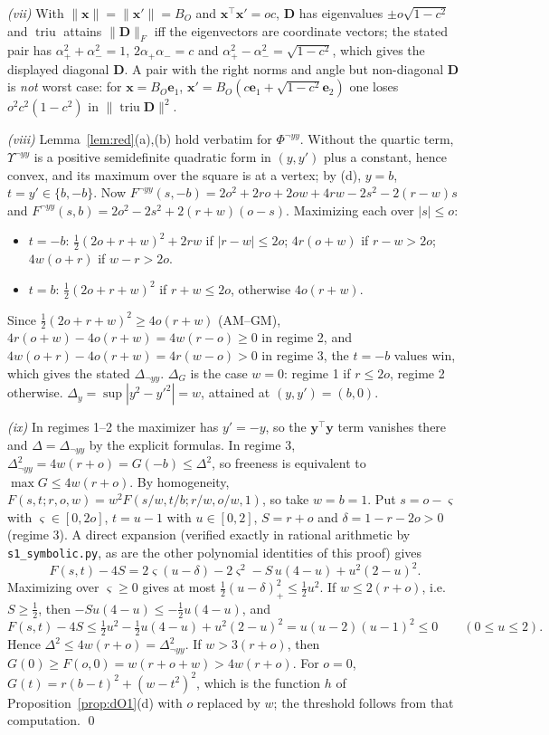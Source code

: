\documentclass[11pt]{article}
\theoremstyle{definition}
\theoremstyle{plain}
\newcommand{\by}{\mathbf{y}}
\newcommand{\bx}{\mathbf{x}}
\DeclareMathOperator{\triu}{triu}
\newcommand{\bD}{\mathbf{D}}
\newcommand{\be}{\mathbf{e}}
\begin{document}
\emph{(vii)} With $\|\bx\|=\|\bx'\|=B_O$ and $\bx^\top\bx'=oc$, $\bD$ has eigenvalues $\pm o\sqrt{1-c^2}$ and $\triu$ attains $\|\bD\|_F$ iff the eigenvectors are coordinate vectors; the stated pair has $\alpha_+^2+\alpha_-^2=1$, $2\alpha_+\alpha_-=c$ and $\alpha_+^2-\alpha_-^2=\sqrt{1-c^2}$, which gives the displayed diagonal $\bD$. A pair with the right norms and angle but non-diagonal $\bD$ is \emph{not} worst case: for $\bx=B_O\be_1$, $\bx'=B_O(c\be_1+\sqrt{1-c^2}\be_2)$ one loses $o^2c^2(1-c^2)$ in $\|\triu\bD\|^2$.

\emph{(viii)} Lemma~\ref{lem:red}(a),(b) hold verbatim for $\Phi^{\neg yy}$. Without the quartic term, $\Upsilon^{\neg yy}$ is a positive semidefinite quadratic form in $(y,y')$ plus a constant, hence convex, and its maximum over the square is at a vertex; by (d), $y=b$, $t=y'\in\{b,-b\}$. Now $F^{\neg yy}(s,-b)=2o^2+2ro+2ow+4rw-2s^2-2(r-w)s$ and $F^{\neg yy}(s,b)=2o^2-2s^2+2(r+w)(o-s)$. Maximizing each over $|s|\le o$:
\begin{itemize}[nosep]
  \item $t=-b$: $\tfrac12(2o+r+w)^2+2rw$ if $|r-w|\le2o$; $4r(o+w)$ if $r-w>2o$; $4w(o+r)$ if $w-r>2o$.
  \item $t=b$: $\tfrac12(2o+r+w)^2$ if $r+w\le2o$, otherwise $4o(r+w)$.
\end{itemize}
Since $\tfrac12(2o+r+w)^2\ge4o(r+w)$ (AM--GM), $4r(o+w)-4o(r+w)=4w(r-o)\ge0$ in regime 2, and $4w(o+r)-4o(r+w)=4r(w-o)>0$ in regime 3, the $t=-b$ values win, which gives the stated $\Delta_{\neg yy}$. $\Delta_G$ is the case $w=0$: regime 1 if $r\le2o$, regime 2 otherwise. $\Delta_y=\sup|y^2-y'^2|=w$, attained at $(y,y')=(b,0)$.

\emph{(ix)} In regimes 1--2 the maximizer has $y'=-y$, so the $\by^\top\by$ term vanishes there and $\Delta=\Delta_{\neg yy}$ by the explicit formulas. In regime 3, $\Delta_{\neg yy}^2=4w(r+o)=G(-b)\le\Delta^2$, so freeness is equivalent to $\max G\le4w(r+o)$. By homogeneity, $F(s,t;r,o,w)=w^2F(s/w,t/b;r/w,o/w,1)$, so take $w=b=1$. Put $s=o-\varsigma$ with $\varsigma\in[0,2o]$, $t=u-1$ with $u\in[0,2]$, $S=r+o$ and $\delta=1-r-2o>0$ (regime 3). A direct expansion (verified exactly in rational arithmetic by \texttt{s1\_symbolic.py}, as are the other polynomial identities of this proof) gives
\begin{equation}
  F(s,t)-4S=2\varsigma(u-\delta)-2\varsigma^2-S\,u(4-u)+u^2(2-u)^2 .
  \label{eq:freeid}
\end{equation}
Maximizing over $\varsigma\ge0$ gives at most $\tfrac12(u-\delta)_+^2\le\tfrac12u^2$. If $w\le2(r+o)$, i.e.\ $S\ge\tfrac12$, then $-Su(4-u)\le-\tfrac12u(4-u)$, and
\[
  F(s,t)-4S\le\tfrac12u^2-\tfrac12u(4-u)+u^2(2-u)^2=u(u-2)(u-1)^2\le0 \qquad(0\le u\le2).
\]
Hence $\Delta^2\le4w(r+o)=\Delta^2_{\neg yy}$. If $w>3(r+o)$, then $G(0)\ge F(o,0)=w(r+o+w)>4w(r+o)$. For $o=0$, $G(t)=r(b-t)^2+(w-t^2)^2$, which is the function $h$ of Proposition~\ref{prop:dO1}(d) with $o$ replaced by $w$; the threshold follows from that computation. \qed
\end{document}
